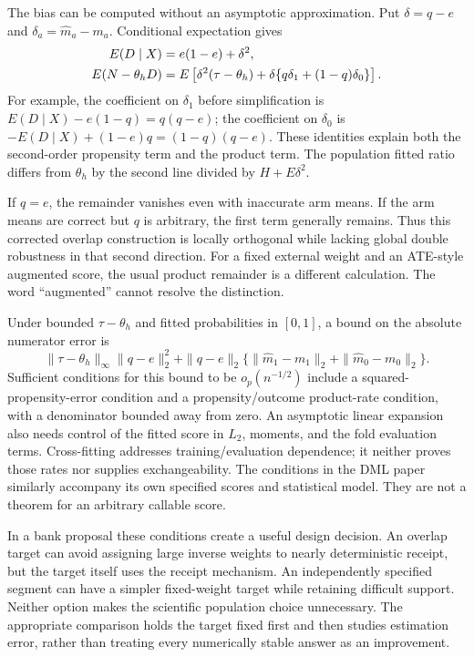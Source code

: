 The bias can be computed without an asymptotic approximation. Put
$\delta=q-e$ and $\delta_a=\widehat m_a-m_a$. Conditional expectation gives
\begin{align}
 E(D\mid X)&=e(1-e)+\delta^2,\notag\\
 E(N-\theta_hD)&=
 E\left[\delta^2(\tau-\theta_h)
       +\delta\{q\delta_1+(1-q)\delta_0\}\right].
 \label{exec17:s4-overlap-remainder}
\end{align}
For example, the coefficient on $\delta_1$ before simplification is
$E(D\mid X)-e(1-q)=q(q-e)$; the coefficient on $\delta_0$ is
$-E(D\mid X)+(1-e)q=(1-q)(q-e)$. These identities explain both the
second-order propensity term and the product term. The population fitted
ratio differs from $\theta_h$ by the second line divided by
$H+E\delta^2$.\citep{exec17_s4_math}

If $q=e$, the remainder vanishes even with inaccurate arm means. If the arm
means are correct but $q$ is arbitrary, the first term generally remains.
Thus this corrected overlap construction is locally orthogonal while lacking
global double robustness in that second direction. For a fixed external
weight and an ATE-style augmented score, the usual product remainder is a
different calculation. The word ``augmented'' cannot resolve the distinction.

Under bounded $\tau-\theta_h$ and fitted probabilities in $[0,1]$, a bound
on the absolute numerator error is
\[
 \|\tau-\theta_h\|_\infty\|q-e\|_2^2+
 \|q-e\|_2\{\|\widehat m_1-m_1\|_2+
                          \|\widehat m_0-m_0\|_2\}.
\]
Sufficient conditions for this bound to be $o_p(n^{-1/2})$ include a
squared-propensity-error condition and a propensity/outcome product-rate
condition, with a denominator bounded away from zero. An asymptotic linear
expansion also needs control of the fitted score in $L_2$, moments, and the
fold evaluation terms. Cross-fitting addresses training/evaluation dependence;
it neither proves those rates nor supplies exchangeability. The conditions in
the DML paper similarly accompany its own specified scores and statistical
model. They are not a theorem for an arbitrary callable score.\citep{dml2018,doubleml2022}

In a bank proposal these conditions create a useful design decision. An
overlap target can avoid assigning large inverse weights to nearly deterministic
receipt, but the target itself uses the receipt mechanism. An independently
specified segment can have a simpler fixed-weight target while retaining
difficult support. Neither option makes the scientific population choice
unnecessary. The appropriate comparison holds the target fixed first and
then studies estimation error, rather than treating every numerically stable
answer as an improvement.

